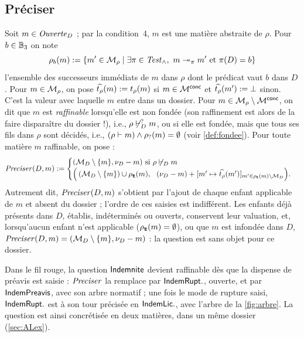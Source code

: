 \documentclass[review]{jflart}
\begin{document}
\subsection{Préciser}\label{sec:preciser}
Soit $m\in\mathit{Ouverte}_D$ ; par la condition~4, $m$ est une matière abstraite de
$\rho$. Pour $b\in\mathbb{B}_3$ on note
\[
\rho_b(m):=\{m'\in\mathcal{M}_\rho\mid \exists\pi\in\mathit{Test}_{{}\wedge{}},\ m\mathrel{\twoheadrightarrow_{\pi}}m'\ \text{et}\ \pi(D)=b\}
\]
l'ensemble des successeurs immédiats de $m$ dans $\rho$ dont le prédicat vaut $b$ dans $D$.
Pour $m\in\mathcal{M}_\rho$, on pose $\widehat{t_\rho}(m):=t_\rho(m)$ si
$m\in\mathcal{M}^{\mathsf{conc}}$ et $\widehat{t_\rho}(m'):=\bot$ sinon. C'est la valeur avec laquelle
$m$ entre dans un dossier. 
Pour $m\in\mathcal{M}_\rho\setminus\mathcal{M}^{\mathsf{conc}}$, on dit que $m$ est \emph{raffinable} lorsqu'elle est non fondée (son raffinement est alors de la faire disparaître du dossier !), i.e., $\rho\not\vdash^{\mathord{?}}_D m$, ou si elle est fondée, mais que tous ses fils dans $\rho$ sont décidés, i.e., $(\rho\vdash m) \wedge \rho_{\mathord{?}}(m)=\emptyset$ (voir \autoref{def:fondee}). Pour toute matière $m$ raffinable, on pose :
\begin{equation}\label{eq:precise}
\mathit{Preciser}(D,m):= \begin{cases}
	(\mathcal{M}_D\setminus\{m\},\nu_D-m)\ \hbox{si } \rho\not\vdash_D m \\
	\Bigl(\,(\mathcal{M}_D\setminus\{m\})\cup\rho_{{\mathsf{t\!t}}}(m),\ \
 	(\nu_D-m)+[m'\mapsto\widehat{t_\rho}(m')]_{m'\in\rho_{{\mathsf{t\!t}}}(m)\setminus\mathcal{M}_D}\Bigr).
	\end{cases}
\end{equation}
Autrement dit, $\mathit{Preciser}(D,m)$ s'obtient par l'ajout de chaque enfant applicable de $m$ et absent du dossier ; l'ordre de ces saisies
est indifférent.
Les enfants déjà présents dans $D$, établis, indéterminés ou ouverts,
conservent leur valuation, et, lorsqu'aucun enfant n'est applicable
($\rho_{{\mathsf{t\!t}}}(m)=\emptyset$), ou que $m$ est infondée dans $D$, $\mathit{Preciser}(D,m)=(\mathcal{M}_D\setminus\{m\}, \nu_D-m)$ : la question est sans
objet pour ce dossier. 

Dans le fil rouge, la question \(\mathsf{Indemnite}\) devient raffinable dès que la
dispense de préavis est saisie : \(\mathit{Preciser}\) la remplace par
\(\mathsf{IndemRupt.}\), ouverte, et par \(\mathsf{IndemPreavis}\), avec son arbre normatif ; une
fois le mode de rupture saisi, \(\mathsf{IndemRupt.}\) est à son tour précisée en
\(\mathsf{IndemLic.}\), avec l'arbre de la \autoref{fig:arbre}. La question est ainsi
concrétisée en deux matières, dans un même dossier (\autoref{sec:ALex}).
\end{document}
